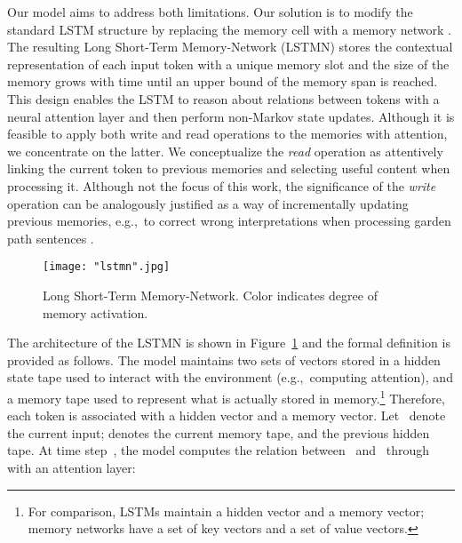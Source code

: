 \documentclass[11pt,letterpaper]{article}
\begin{document}
        Our model aims to address both limitations. Our solution is to
        modify the standard LSTM structure by replacing the memory
        cell with a memory network \cite{weston2014memory}.  The
        resulting Long Short-Term Memory-Network (LSTMN) stores the
        contextual representation of each input token with a unique
        memory slot and the size of the memory grows with time until
        an upper bound of the memory span is reached.  This design
        enables the LSTM to reason about relations between tokens with
        a neural attention layer and then perform non-Markov state
        updates.  Although it is feasible to apply both write and read
        operations to the memories with attention, we concentrate on
        the latter. We conceptualize the \emph{read} operation as
        attentively linking the current token to previous memories and
        selecting useful content when processing it. Although not the
        focus of this work, the significance of the \emph{write}
        operation can be analogously justified as a way of
        incrementally updating previous memories, e.g.,~to correct
        wrong interpretations when processing garden path sentences
        \cite{Ferreira:Henderson:1991}.

			\begin{figure}[t]
				\begin{center}
					\hspace*{-1.5ex}\texttt{[image: "lstmn".jpg]}
				\end{center}
				\caption{\label{lstmn} Long Short-Term Memory-Network. Color indicates degree of memory activation.}
				\vspace{-2.5ex}
			\end{figure}

                        The architecture of the LSTMN is shown in
                        Figure~\ref{lstmn} and the formal definition
                        is provided as follows.  The model maintains
                        two sets of vectors stored in a hidden state
                        tape used to interact with the environment
                        (e.g.,~computing attention), and a memory tape
                        used to represent what is actually stored in
                        memory.\footnote{For comparison, LSTMs maintain a hidden
                          vector and a memory vector; memory networks
                          \cite{weston2014memory} have a set of key
                          vectors and a set of value vectors.}
                        Therefore, each token is associated with a
                        hidden vector and a memory vector.  Let~
                        denote the current input;  denotes the current memory
                        tape, and 
                        the previous hidden tape.  At time step~,
                        the model computes the relation between~
                        and~ through~ with an attention layer:
                        
\end{document}
